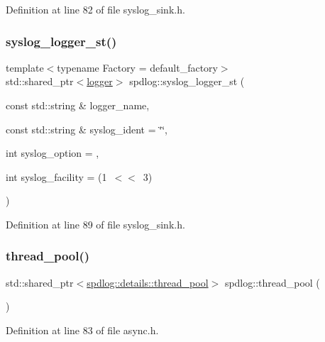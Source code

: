 Definition at line 82 of file syslog\+\_\+sink.\+h.

\mbox{\label{namespacespdlog_a2b5f25193cf4478d74cf9402a120c902}} 
\subsubsection{\texorpdfstring{syslog\+\_\+logger\+\_\+st()}{syslog\_logger\_st()}}
{\footnotesize\ttfamily template$<$typename Factory  = default\+\_\+factory$>$ \\
std\+::shared\+\_\+ptr$<$\hyperlink{classspdlog_1_1logger}{logger}$>$ spdlog\+::syslog\+\_\+logger\+\_\+st (\begin{DoxyParamCaption}\item[{const std\+::string \&}]{logger\+\_\+name,  }\item[{const std\+::string \&}]{syslog\+\_\+ident = {\ttfamily \char`\"{}\char`\"{}},  }\item[{int}]{syslog\+\_\+option = {},  }\item[{int}]{syslog\+\_\+facility = {\ttfamily (1~$<$$<$~3)} }\end{DoxyParamCaption})\hspace{0.3cm}{\ttfamily [inline]}}



Definition at line 89 of file syslog\+\_\+sink.\+h.

\mbox{\label{namespacespdlog_a6676a1ffb5ea174a2392ab0317bbcff2}} 
\subsubsection{\texorpdfstring{thread\+\_\+pool()}{thread\_pool()}}
{\footnotesize\ttfamily std\+::shared\+\_\+ptr$<$\hyperlink{classspdlog_1_1details_1_1thread__pool}{spdlog\+::details\+::thread\+\_\+pool}$>$ spdlog\+::thread\+\_\+pool (\begin{DoxyParamCaption}{ }\end{DoxyParamCaption})\hspace{0.3cm}{\ttfamily [inline]}}



Definition at line 83 of file async.\+h.

